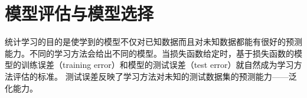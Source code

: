 \section{模型评估与模型选择}
统计学习的目的是使学到的模型不仅对已知数据而且对未知数据都能有很好的预测能力。不同的学习方法会给出不同的模型。当损失函数给定时，基于损失函数的模型的训练误差（training error）和模型的测试误差（test error）就自然成为学习方法评估的标准。
测试误差反映了学习方法对未知的测试数据集的预测能力——泛化能力。